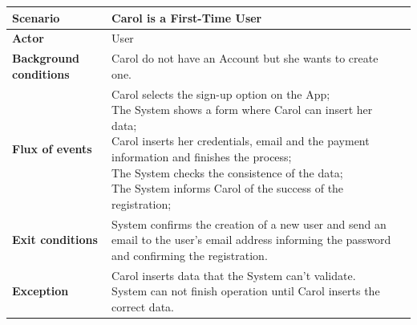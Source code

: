 \documentclass[a4paper]{article}
\begin{document}
\begin{tabular}{ |  l  |   l |  l  |  }
\hline
	\textbf { \textbf{Scenario}} & Carol is a First-Time User\\ \hline
	 \textbf{Actor}& User\\ \hline
	\textbf{Background conditions}&\parbox[t]{8cm}{Carol do not have an Account but she wants to create one. } \\ \hline
	\textbf{Flux of events} & \parbox[t]{8cm}{\textbullet  Carol selects the sign-up option on the App;\\\textbullet The System shows a form where Carol can insert her data;\\\textbullet Carol inserts her credentials, email and the payment information and finishes the process;\\\textbullet  The System checks the consistence of the data;\\\textbullet  The System informs Carol of the success of the registration;}\\ \hline
	\textbf{Exit conditions} &\parbox[t]{8cm}{ System confirms the creation of a new user and send an email to the user's email address informing the password and confirming the registration.}\\ \hline
	\textbf{Exception} & \parbox[t]{8cm}{Carol inserts data that the System can't validate. System can not finish operation until Carol inserts the correct data.   }\\ \hline
\end{tabular}
\newline
\end{document}
